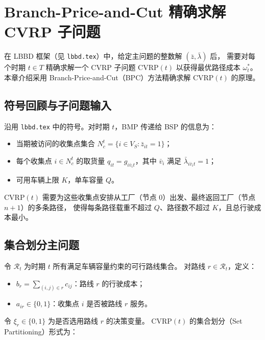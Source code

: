 \documentclass{article}
\begin{document}
\section{Branch-Price-and-Cut 精确求解 CVRP 子问题}

在 LBBD 框架（见 \texttt{lbbd.tex}）中，给定主问题的整数解 $(\bar z,\bar\lambda)$ 后，
需要对每个时期 $t\in T$ 精确求解一个 CVRP 子问题 $\text{CVRP}(t)$ 以获得最优路径成本 $\omega_t^*$。
本章介绍采用 Branch-Price-and-Cut（BPC）方法精确求解 $\text{CVRP}(t)$ 的原理。

\subsection{符号回顾与子问题输入}

沿用 \texttt{lbbd.tex} 中的符号。对时期 $t$，BMP 传递给 BSP 的信息为：
\begin{itemize}[leftmargin=2em]
  \item 当期被访问的收集点集合 $N_c^t = \{i \in V_S : \bar z_{it} = 1\}$；
  \item 每个收集点 $i \in N_c^t$ 的取货量 $q_{it} = g_{i\bar v_i t}$，其中 $\bar v_i$ 满足 $\bar\lambda_{i\bar v_i t} = 1$；
  \item 可用车辆上限 $K$，单车容量 $Q$。
\end{itemize}

$\text{CVRP}(t)$ 需要为这些收集点安排从工厂（节点 $0$）出发、最终返回工厂（节点 $n+1$）的多条路径，
使得每条路径载重不超过 $Q$、路径数不超过 $K$，且总行驶成本最小。

\subsection{集合划分主问题}
\label{sec:bpc_master}

令 $\mathcal{R}_t$ 为时期 $t$ 所有满足车辆容量约束的可行路线集合。
对路线 $r \in \mathcal{R}_t$，定义：
\begin{itemize}[leftmargin=2em]
  \item $b_r = \sum_{(i,j) \in r} c_{ij}$：路线 $r$ 的行驶成本；
  \item $a_{ir} \in \{0,1\}$：收集点 $i$ 是否被路线 $r$ 服务。
\end{itemize}
令 $\xi_r \in \{0,1\}$ 为是否选用路线 $r$ 的决策变量。
$\text{CVRP}(t)$ 的集合划分（Set Partitioning）形式为：
\end{document}
